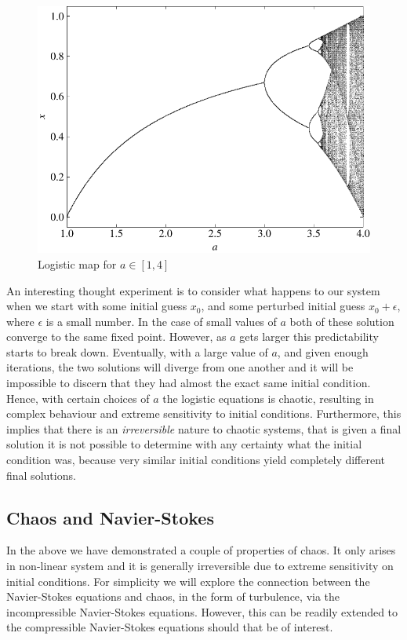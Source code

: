 \begin{figure}[htbp]
	\centering
	\includegraphics[width=0.65\linewidth]{Pictures/ch7_logistic_map}
	\caption{Logistic map for $a\in[1,4]$}
	\label{fig:logistic_map}
\end{figure}
An interesting thought experiment is to consider what happens to our system when we start with some initial guess $x_0$, and some perturbed initial guess $x_0 + \epsilon$, where $\epsilon$ is a small number. In the case of small values of $a$ both of these solution converge to the same fixed point. However, as $a$ gets larger this predictability starts to break down. Eventually, with a large value of $a$, and given enough iterations, the two solutions will diverge from one another and it will be impossible to discern that they had almost the exact same initial condition. Hence, with certain choices of $a$ the logistic equations is chaotic, resulting in complex behaviour and extreme sensitivity to initial conditions. Furthermore, this implies that there is an {\it irreversible} nature to chaotic systems, that is given a final solution it is not possible to determine with any certainty what the initial condition was, because very similar initial conditions yield completely different final solutions.

\subsection{Chaos and Navier-Stokes}
In the above we have demonstrated a couple of properties of chaos. It only arises in non-linear system and it is generally irreversible due to extreme sensitivity on initial conditions. For simplicity we will explore the connection between the Navier-Stokes equations and chaos, in the form of turbulence, via the incompressible Navier-Stokes equations. However, this can be readily extended to the compressible Navier-Stokes equations should that be of interest.

